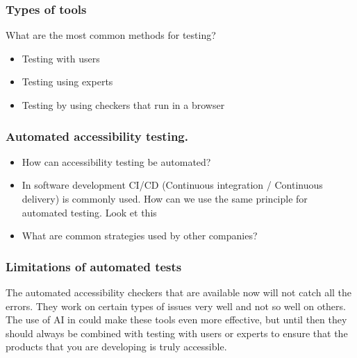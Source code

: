 \documentclass{master_thesis}
\begin{document}
\subsubsection{Types of tools}

\citep{Sane2021}
\citep{AbouZahra2017}
\citep{AbouZahra2020}
\citep{Alsaeedi2020}
\citep{WebAIM2019}
What are the most common methods for testing?

\begin{itemize}
	\item Testing with users
	\item Testing using experts
	\item Testing by using checkers that run in a browser
\end{itemize}
\subsubsection{Automated accessibility testing.}

\begin{itemize}
	\item How can accessibility testing be automated?
	\item In software development CI/CD (Continuous integration / Continuous delivery) is commonly used. How can we use the same principle for automated testing. Look et this \citep{}
	\item What are common strategies used by other companies?
\end{itemize}

\subsubsection{Limitations of automated tests}

The automated accessibility checkers that are available now will not catch all the errors. They work on certain types of issues very well and not so well on others. The use of AI in could make these tools even more effective,  but until then they should always be combined with testing with users or experts to ensure that the products that you are developing is truly accessible.
\end{document}
